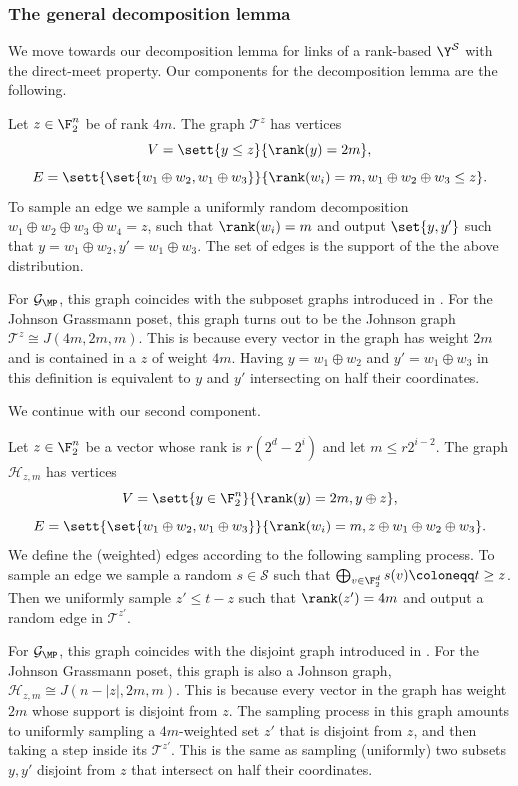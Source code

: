 \subsubsection{The general decomposition lemma}
We move towards our decomposition lemma for links of a rank-based \(\Y^{\mathcal{S}}\) with the direct-meet property. Our components for the decomposition lemma are the following.
\begin{definition}
    Let \(z \in \F_2^n\) be of rank \(4m\). The graph \(\mathcal{T}^{z}\) has vertices
    \[V = \sett{y \leq z}{\rank(y)=2m},\]
    \[E = \sett{\set{w_1 \oplus w_2, w_1 \oplus w_3}}{\rank(w_i) = m, w_1 \oplus w_2 \oplus w_3 \leq z}.\]
    To sample an edge we sample a uniformly random decomposition \(w_1\oplus w_2 \oplus w_3 \oplus w_4 = z\), such that \(\rank(w_i) = m\) and output \(\set{y,y'}\) such that \(y=w_1 \oplus w_2, y'=w_1 \oplus w_3\). The set of edges is the support of the the above distribution.
\end{definition}
For \(\mathcal{G}_{\MP}\), this graph coincides with the subposet graphs introduced in . For the Johnson Grassmann poset, this graph turns out to be the Johnson graph \(\mathcal{T}^z \cong J(4m,2m,m)\). This is because every vector in the graph has weight \(2m\) and is contained in a \(z\) of weight \(4m\). Having \(y=w_1 \oplus w_2\) and \(y'=w_1 \oplus w_3\) in this definition is equivalent to \(y\) and \(y'\) intersecting on half their coordinates.

We continue with our second component.

\begin{definition} \label{def:abstract-link-graph}
    Let \(z \in \F_2^n\) be a vector whose rank is \(r(2^d - 2^i)\) and let \(m \leq r2^{i-2}\). The graph \(\mathcal{H}_{z,m}\) has vertices
    \[V = \sett{y \in \F^n_2}{\rank(y)=2m, y \oplus z},\]
    \[E = \sett{\set{w_1 \oplus w_2, w_1 \oplus w_3}}{\rank(w_i)=m, z \oplus w_1 \oplus w_2 \oplus w_3}.\]
    We define the (weighted) edges according to the following sampling process. To sample an edge we sample a random \(s \in \mathcal{S}\) such that \(\bigoplus_{v \in \F_2^d}s(v) \coloneqq t \geq z\). Then we uniformly sample \(z' \leq t-z\) such that \(\rank(z') = 4m\) and output a random edge in \(\mathcal{T}^{z'}\).
\end{definition}
For \(\mathcal{G}_{\MP}\), this graph coincides with the disjoint graph introduced in . For the Johnson Grassmann poset, this graph is also a Johnson graph, \(\mathcal{H}_{z,m} \cong J(n-|z|,2m,m)\). This is because every vector in the graph has weight \(2m\) whose support is disjoint from \(z\). The sampling process in this graph amounts to uniformly sampling a \(4m\)-weighted set \(z'\) that is disjoint from \(z\), and then taking a step inside its \(\mathcal{T}^{z'}\). This is the same as sampling (uniformly) two subsets \(y,y'\) disjoint from \(z\) that intersect on half their coordinates.

